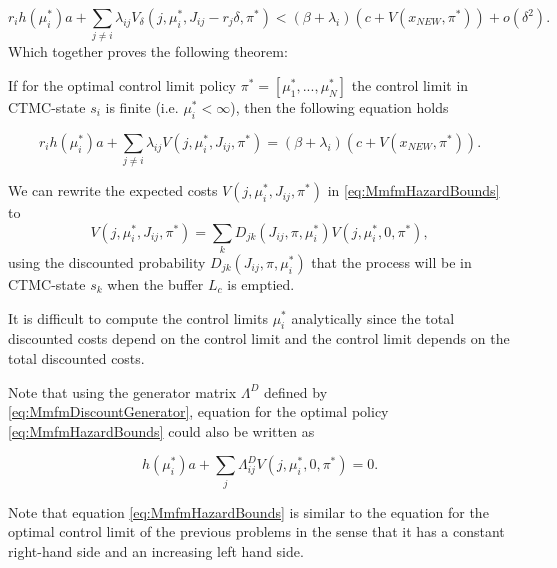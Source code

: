 \[
r_ih(\mu_i^*)a+\sum\limits_{j\neq i}\lambda_{ij} V_\delta(j,\mu_i^*,J_{ij}-r_j\delta,\pi^*)<
(\beta+\lambda_i)(c+V(x_{NEW},\pi^*))+o(\delta^2).
\]
Which together proves the following theorem:
\begin{theorem}
	If for the optimal control limit policy $\pi^*=[\mu_1^*,...,\mu_N^*]$ the control limit in CTMC-state $s_i$ is finite (i.e. $\mu_i^*<\infty$), then the following equation holds 
	
	\begin{equation}\label{eq:MmfmHazardBounds}
	r_ih(\mu_i^*)a+\sum\limits_{j\neq i}\lambda_{ij} V(j,\mu_i^*,J_{ij},\pi^*)=
	(\beta+\lambda_i)(c+V(x_{NEW},\pi^*)).
	\end{equation}
\end{theorem}
\begin{remark}
	We can rewrite the expected costs $V(j,\mu_i^*,J_{ij},\pi^*)$ in \eqref{eq:MmfmHazardBounds} to
	\[
	V(j,\mu_i^*,J_{ij},\pi^*)=\sum\limits_k D_{jk}(J_{ij},\pi,\mu_i^*)V(j,\mu_i^*,0,\pi^*),
	\]
	using the discounted probability $D_{jk}(J_{ij},\pi,\mu_i^*)$ that the process will be in CTMC-state $s_k$ when the buffer $L_c$ is emptied.
\end{remark}

\begin{remark}
	It is difficult to compute the control limits $\mu_i^*$ analytically since the total discounted costs depend on the control limit and the control limit depends on the total discounted costs.
\end{remark}

\begin{remark}
Note that using the generator matrix $\Lambda^D$ defined by \eqref{eq:MmfmDiscountGenerator}, equation for the optimal policy \eqref{eq:MmfmHazardBounds} could also be written as

\begin{equation}\label{eq:MmfmHazardBoundsShort}
h(\mu_i^*)a+\sum\limits_j\Lambda^D_{ij}V(j,\mu_i^*,0,\pi^*)=0.
\end{equation}
\end{remark}

\begin{remark}
Note that equation \eqref{eq:MmfmHazardBounds} is similar to the equation for the optimal control limit of the previous problems in the sense that it has a constant right-hand side and an increasing left hand side.
\end{remark}